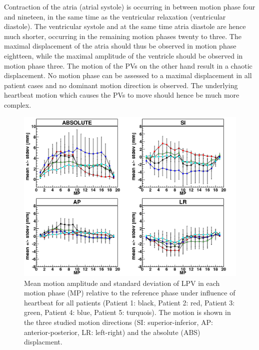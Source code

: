Contraction of the atria (atrial systole) is occurring in between motion phase four and nineteen, in the same time as the ventricular relaxation 
(ventricular diastole). The ventricular systole and at the same time atria diastole are hence much shorter, occurring in the 
remaining motion phases twenty to three. The maximal displacement of the atria should thus be observed in motion phase eightteen, while the 
maximal amplitude of the ventricle should be observed in motion phase three. The motion of the PVs on the other hand result in a 
chaotic displacement. No motion phase can be assessed to a maximal displacement in all patient cases and no dominant motion direction is 
observed. The underlying heartbeat motion which causes the PVs to move should hence be much more complex. 

\newpage

\begin{figure}[H]
\begin{center}
 \includegraphics[scale=0.22]{./teile/results_human/MAYO_allPatients_HB_LPV.png}
\caption{Mean motion amplitude and standard deviation of LPV in each motion phase (MP) relative to the reference phase under influence of 
heartbeat for all patients (Patient 1: black, Patient 2: red, Patient 3: green, Patient 4: blue, Patient 5: turquois). 
The motion is shown in the three studied motion directions (SI: superior-inferior, AP: anterior-posterior, LR: left-right) and the absolute 
(ABS) displacment.}
\label{fig:motion_hb_lpv}
\end{center}
\end{figure}

\vspace*{-1.3cm}

